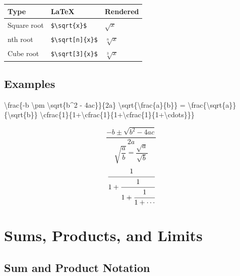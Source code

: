 \documentclass[
  letterpaper,
  DIV=11,
  numbers=noendperiod]{scrartcl}
\newenvironment{Shaded}{\begin{snugshade}}{\end{snugshade}}
\newcommand{\SpecialCharTok}[1]{\textcolor[rgb]{0.37,0.37,0.37}{#1}}
\newcommand{\SpecialStringTok}[1]{\textcolor[rgb]{0.13,0.47,0.30}{#1}}
\begin{document}
\begin{longtable}[]{@{}lll@{}}
\toprule()
Type & LaTeX & Rendered \\
\midrule()
\endhead
Square root & \texttt{\$\textbackslash{}sqrt\{x\}\$} & \(\sqrt{x}\) \\
nth root & \texttt{\$\textbackslash{}sqrt{[}n{]}\{x\}\$} &
\(\sqrt[n]{x}\) \\
Cube root & \texttt{\$\textbackslash{}sqrt{[}3{]}\{x\}\$} &
\(\sqrt[3]{x}\) \\
\bottomrule()
\end{longtable}

\hypertarget{examples-1}{%
\subsection{Examples}\label{examples-1}}

\begin{Shaded}
\begin{Highlighting}[]
\SpecialStringTok{$$}\SpecialCharTok{\textbackslash{}frac}\SpecialStringTok{\{{-}b }\SpecialCharTok{\textbackslash{}pm}\SpecialStringTok{ }\SpecialCharTok{\textbackslash{}sqrt}\SpecialStringTok{\{b\^{}2 {-} 4ac\}\}\{2a\}$$}
\SpecialStringTok{$$}\SpecialCharTok{\textbackslash{}sqrt}\SpecialStringTok{\{}\SpecialCharTok{\textbackslash{}frac}\SpecialStringTok{\{a\}\{b\}\} = }\SpecialCharTok{\textbackslash{}frac}\SpecialStringTok{\{}\SpecialCharTok{\textbackslash{}sqrt}\SpecialStringTok{\{a\}\}\{}\SpecialCharTok{\textbackslash{}sqrt}\SpecialStringTok{\{b\}\}$$}
\SpecialStringTok{$$}\SpecialCharTok{\textbackslash{}cfrac}\SpecialStringTok{\{1\}\{1+}\SpecialCharTok{\textbackslash{}cfrac}\SpecialStringTok{\{1\}\{1+}\SpecialCharTok{\textbackslash{}cfrac}\SpecialStringTok{\{1\}\{1+}\SpecialCharTok{\textbackslash{}cdots}\SpecialStringTok{\}\}\}$$}
\end{Highlighting}
\end{Shaded}

\[\frac{-b \pm \sqrt{b^2 - 4ac}}{2a}\]
\[\sqrt{\frac{a}{b}} = \frac{\sqrt{a}}{\sqrt{b}}\]
\[\cfrac{1}{1+\cfrac{1}{1+\cfrac{1}{1+\cdots}}}\]

\hypertarget{sums-products-and-limits}{%
\section{Sums, Products, and Limits}\label{sums-products-and-limits}}

\hypertarget{sum-and-product-notation}{%
\subsection{Sum and Product Notation}\label{sum-and-product-notation}}
\end{document}
